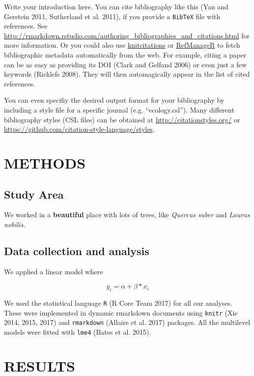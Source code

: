 \documentclass[11pt,a4paper]{article}
\begin{document}
Write your introduction here. You can cite bibliography like this (Yan
and Gerstein 2011, Sutherland et al. 2011), if you provide a
\texttt{BibTeX} file with references. See
\url{http://rmarkdown.rstudio.com/authoring_bibliographies_and_citations.html}
for more information. Or you could also use
\href{https://cran.r-project.org/web/packages/knitcitations/index.html}{knitcitations}
or
\href{https://cran.r-project.org/web/packages/RefManageR/index.html}{RefManageR}
to fetch bibliographic metadata automatically from the web. For example,
citing a paper can be as easy as providing its DOI (Clark and Gelfand
2006) or even just a few keywords (Ricklefs 2008). They will then
automagically appear in the list of cited references.

You can even specifiy the desired output format for your bibliography by
including a style file for a specific journal (e.g. ``ecology.csl'').
Many different bibliography styles (CSL files) can be obtained at
\url{http://citationstyles.org/} or
\url{https://github.com/citation-style-language/styles}.

\section{METHODS}\label{methods}

\subsection{Study Area}\label{study-area}

We worked in a \textbf{beautiful} place with lots of trees, like
\emph{Quercus suber} and \emph{Laurus nobilis}.

\subsection{Data collection and
analysis}\label{data-collection-and-analysis}

We applied a linear model where

\[
y_{i} = \alpha + \beta*x_{i} 
\]

We used the statistical language \texttt{R} (R Core Team 2017) for all
our analyses. These were implemented in dynamic rmarkdown documents
using \texttt{knitr} (Xie 2014, 2015, 2017) and \texttt{rmarkdown}
(Allaire et al. 2017) packages. All the multilevel models were fitted
with \texttt{lme4} (Bates et al. 2015).

\section{RESULTS}\label{results}
\end{document}
